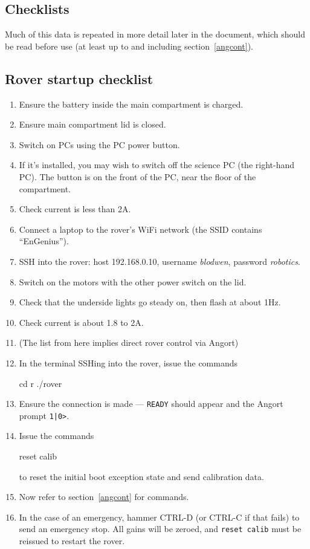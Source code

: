 \subsection{Checklists}
Much of this data is repeated in more detail later in the document,
which should be read before use (at least up to and including section~\ref{angcont}).
\subsection{Rover startup checklist}
\begin{enumerate}
\item Ensure the battery inside the main compartment is charged.
\item Ensure main compartment lid is closed.
\item Switch on PCs using the PC power button.
\item If it's installed, you may wish to switch off the science PC (the right-hand PC). The button is on
the front of the PC, near the floor of the compartment.
\item Check current is less than 2A.
\item Connect a laptop to the rover's WiFi network (the SSID contains ``EnGenius'').
\item SSH into the rover: host 192.168.0.10, username \emph{blodwen}, password \emph{robotics}.
\item Switch on the motors with the other power switch on the lid.
\item Check that the underside lights go steady on, then flash at about 1Hz.
\item Check current is about 1.8 to 2A.
\item (The list from here implies direct rover control via Angort)
\item In the terminal SSHing into the rover, issue the commands
\begin{v}
cd r
./rover
\end{v}
\item Ensure the connection is made --- \texttt{READY} should appear
and the Angort prompt \texttt{1|0>}.
\item Issue the commands
\begin{v}
reset calib
\end{v}
to reset the initial boot exception state and send calibration data.
\item Now refer to section~\ref{angcont} for commands.
\item In the case of an emergency, hammer CTRL-D (or CTRL-C if that
fails) to send an emergency stop. All gains will be zeroed, and 
\texttt{reset calib} must be reissued to restart the rover.
\end{enumerate}
